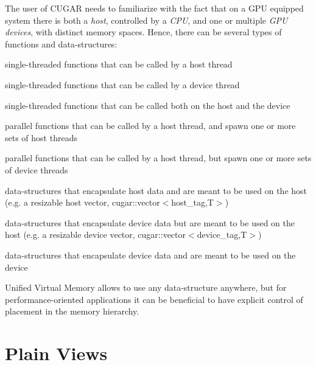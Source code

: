 \begin{DoxyParagraph}{}
The user of C\+U\+G\+AR needs to familiarize with the fact that on a G\+PU equipped system there is both a {\itshape host}, controlled by a {\itshape C\+PU}, and one or multiple {\itshape G\+PU} {\itshape devices}, with distinct memory spaces. Hence, there can be several types of functions and data-\/structures\+: 
\end{DoxyParagraph}
\begin{DoxyParagraph}{}

\begin{DoxyItemize}
\item single-\/threaded functions that can be called by a host thread
\item single-\/threaded functions that can be called by a device thread
\item single-\/threaded functions that can be called both on the host and the device
\item parallel functions that can be called by a host thread, and spawn one or more sets of host threads
\item parallel functions that can be called by a host thread, but spawn one or more sets of device threads 
\end{DoxyItemize}
\end{DoxyParagraph}
\begin{DoxyParagraph}{}

\begin{DoxyItemize}
\item data-\/structures that encapsulate host data and are meant to be used on the host (e.\+g. a resizable host vector, cugar\+::vector$<$host\+\_\+tag,\+T$>$)
\item data-\/structures that encapsulate device data but are meant to be used on the host (e.\+g. a resizable device vector, cugar\+::vector$<$device\+\_\+tag,\+T$>$)
\item data-\/structures that encapsulate device data and are meant to be used on the device 
\end{DoxyItemize}
\end{DoxyParagraph}
\begin{DoxyParagraph}{}
Unified Virtual Memory allows to use any data-\/structure anywhere, but for performance-\/oriented applications it can be beneficial to have explicit control of placement in the memory hierarchy.
\end{DoxyParagraph}
\hypertarget{host_device_page_PlainViewsSection}{}\section{Plain Views}\label{host_device_page_PlainViewsSection}
